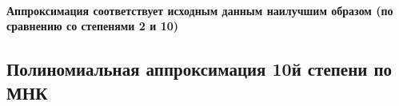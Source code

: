 \documentclass[11pt]{article}
\begin{document}
    \paragraph{Аппроксимация соответствует исходным данным наилучшим образом
(по сравнению со степенями 2 и
10)}\label{ux430ux43fux43fux440ux43eux43aux441ux438ux43cux430ux446ux438ux44f-ux441ux43eux43eux442ux432ux435ux442ux441ux442ux432ux443ux435ux442-ux438ux441ux445ux43eux434ux43dux44bux43c-ux434ux430ux43dux43dux44bux43c-ux43dux430ux438ux43bux443ux447ux448ux438ux43c-ux43eux431ux440ux430ux437ux43eux43c-ux43fux43e-ux441ux440ux430ux432ux43dux435ux43dux438ux44e-ux441ux43e-ux441ux442ux435ux43fux435ux43dux44fux43cux438-2-ux438-10}

    \subsection{Полиномиальная аппроксимация 10й степени по
МНК}\label{ux43fux43eux43bux438ux43dux43eux43cux438ux430ux43bux44cux43dux430ux44f-ux430ux43fux43fux440ux43eux43aux441ux438ux43cux430ux446ux438ux44f-10ux439-ux441ux442ux435ux43fux435ux43dux438-ux43fux43e-ux43cux43dux43a}
\end{document}
